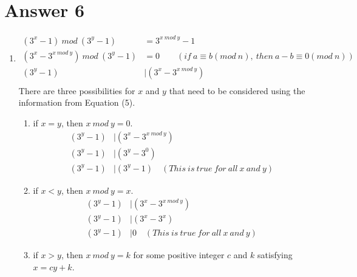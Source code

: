 \documentclass[12pt]{article}
\begin{document}
\section*{Answer 6}

\renewcommand{\theenumi}{\alph{enumi}}
\begin{enumerate}
    \item
    \begin{equation}
        \begin{split}
            (3^x - 1) \ mod \ (3^y - 1) & = 3^{x \ mod \ y} - 1\\
            (3^x - 3^{x \ mod \ y}) \ mod \ (3^y - 1) & = 0 \qquad (if \ a \equiv b (mod \ n), \ then \ a - b \equiv 0 (mod \ n)) \\
            (3^y - 1) & | (3^x - 3^{x\ mod \ y})\\
        \end{split}
    \end{equation}
    There are three possibilities for $x$ and $y$ that need to be considered using the information from Equation (5).
    \renewcommand{\theenumii}{\roman{enumii}}
    \begin{enumerate}
        \item if $x = y$, then $x \ mod \ y = 0$.
        \begin{equation}
            \begin{split}
                (3^y - 1) & | (3^x - 3^{x\ mod \ y})\\
                (3^y - 1) & | (3^y - 3^0)\\
                (3^y - 1) & | (3^y - 1) \quad (This \ is \ true \ for \ all \ x \ and \ y)
            \end{split}
        \end{equation}
        \item if $x < y$, then $x \ mod \ y = x$.
        \begin{equation}
            \begin{split}
                (3^y - 1) & | (3^x - 3^{x\ mod \ y})\\
                (3^y - 1) & | (3^x - 3^x)\\
                (3^y - 1) & | 0 \quad (This \ is \ true \ for \ all \ x \ and \ y)
            \end{split}
        \end{equation}
        \item if $x > y$, then $x \ mod \ y = k$ for some positive integer $c$ and $k$ satisfying $x = cy + k$.
        \begin{equation}

\end{equation}
\end{enumerate}
\end{enumerate}
\end{document}
